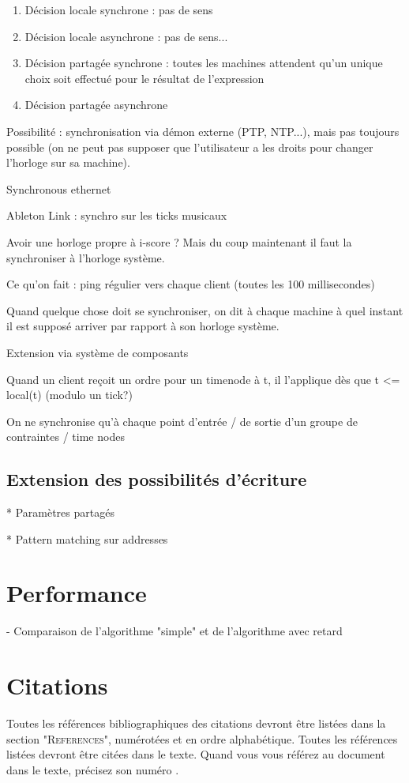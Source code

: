 \documentclass{article}
\begin{document}
\begin{enumerate}
\item Décision locale synchrone : pas de sens
\item Décision locale asynchrone : pas de sens... 
\item Décision partagée synchrone : toutes les machines attendent qu'un unique choix soit effectué pour le résultat de l'expression
\item Décision partagée asynchrone
\end{enumerate}

Possibilité : synchronisation via démon externe (PTP, NTP...), mais pas toujours possible (on ne peut pas supposer que l'utilisateur a les droits pour changer l'horloge sur sa machine).

Synchronous ethernet

Ableton Link : synchro sur les ticks musicaux 

Avoir une horloge propre à i-score ? Mais du coup maintenant il faut la synchroniser à l'horloge système. 

Ce qu'on fait : ping régulier vers chaque client (toutes les 100 millisecondes)

Quand quelque chose doit se synchroniser, on dit à chaque machine à quel instant il est supposé arriver par rapport à son horloge système.

Extension via système de composants

Quand un client reçoit un ordre pour un timenode à t, il l'applique dès que t <= local(t) (modulo un tick?)

On ne synchronise qu'à chaque point d'entrée / de sortie d'un groupe de contraintes / time nodes
\subsection{Extension des possibilités d'écriture}
* Paramètres partagés

* Pattern matching sur addresses 

\section{Performance}
- Comparaison de l'algorithme "simple" et de l'algorithme avec retard

\section{Citations}

Toutes les références bibliographiques des citations devront être listées dans la section "\textsc{References}", numérotées et en ordre alphabétique. Toutes les références  listées devront être citées dans le texte. Quand  vous vous référez au document dans le texte, précisez son numéro \cite{Author:00}.


\end{document}
